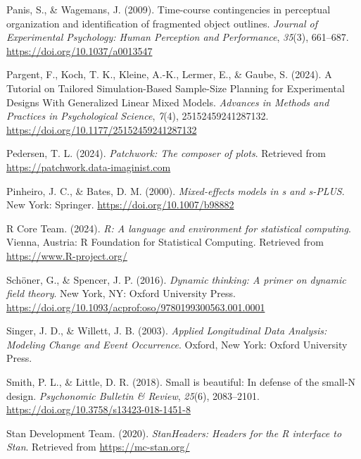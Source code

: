 \documentclass[
  man, donotrepeattitle,floatsintext]{apa6}
\newlength{\cslhangindent}
\newenvironment{CSLReferences}[2] %
 {\begin{list}{}{%
  \setlength{\itemindent}{0pt}
  \setlength{\leftmargin}{0pt}
  \setlength{\parsep}{0pt}
  \ifodd #1
   \setlength{\leftmargin}{\cslhangindent}
   \setlength{\itemindent}{-1\cslhangindent}
  \fi
  \setlength{\itemsep}{#2\baselineskip}}}
 {\end{list}}
\begin{document}
\begin{CSLReferences}{1}{0}
Panis, S., \& Wagemans, J. (2009). Time-course contingencies in perceptual organization and identification of fragmented object outlines. \emph{Journal of Experimental Psychology: Human Perception and Performance}, \emph{35}(3), 661--687. \url{https://doi.org/10.1037/a0013547}

Pargent, F., Koch, T. K., Kleine, A.-K., Lermer, E., \& Gaube, S. (2024). A {Tutorial} on {Tailored Simulation-Based Sample-Size Planning} for {Experimental Designs With Generalized Linear Mixed Models}. \emph{Advances in Methods and Practices in Psychological Science}, \emph{7}(4), 25152459241287132. \url{https://doi.org/10.1177/25152459241287132}

Pedersen, T. L. (2024). \emph{Patchwork: The composer of plots}. Retrieved from \url{https://patchwork.data-imaginist.com}

Pinheiro, J. C., \& Bates, D. M. (2000). \emph{Mixed-effects models in s and s-PLUS}. New York: Springer. \url{https://doi.org/10.1007/b98882}

R Core Team. (2024). \emph{R: A language and environment for statistical computing}. Vienna, Austria: R Foundation for Statistical Computing. Retrieved from \url{https://www.R-project.org/}

Schöner, G., \& Spencer, J. P. (2016). \emph{Dynamic thinking: A primer on dynamic field theory}. New York, NY: Oxford University Press. \url{https://doi.org/10.1093/acprof:oso/9780199300563.001.0001}

Singer, J. D., \& Willett, J. B. (2003). \emph{Applied {Longitudinal Data Analysis}: {Modeling Change} and {Event Occurrence}}. Oxford, New York: Oxford University Press.

Smith, P. L., \& Little, D. R. (2018). Small is beautiful: {In} defense of the small-{N} design. \emph{Psychonomic Bulletin \& Review}, \emph{25}(6), 2083--2101. \url{https://doi.org/10.3758/s13423-018-1451-8}

Stan Development Team. (2020). \emph{{StanHeaders}: Headers for the {R} interface to {Stan}}. Retrieved from \url{https://mc-stan.org/}


\end{CSLReferences}
\end{document}
